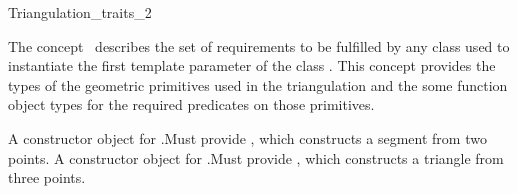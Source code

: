 

\begin{ccRefConcept}{Triangulation_traits_2}


\ccDefinition
  
The concept \ccRefName\ describes 
 the set of requirements to be
fulfilled
by any class used to instantiate the first template parameter of the class 
.
This concept provides the types of the geometric primitives used in the
triangulation and the some function object types
for the required predicates on those primitives.

\ccTypes
{}
\ccGlue
{}
\ccGlue
{}

 {A constructor object for
.Must provide , which constructs a  segment from two points.}
\ccGlue
{} {A constructor object for
.Must provide , which constructs a triangle from three points.}


\end{ccRefConcept}
